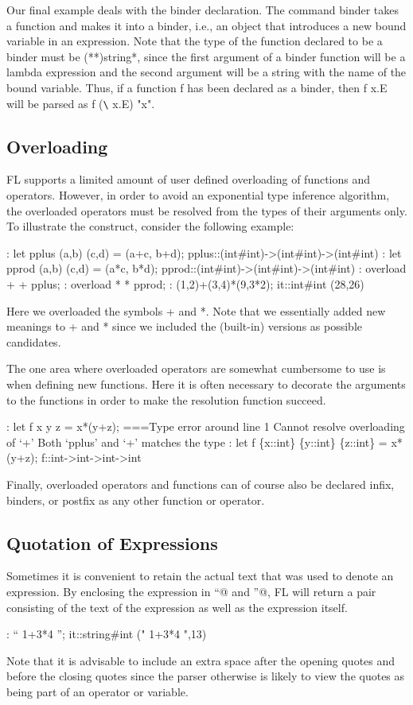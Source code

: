 Our final example deals with the binder declaration.
The command binder takes a function and makes it into a binder, i.e., an
object that introduces a new bound variable in an expression.
Note that the type of the function declared to be a binder must be
(*\funarrow **)\funarrow string\funarrow **, since the first argument of
a binder function will be a lambda expression and the second argument will
be a string with the name of the bound variable.
Thus, if a function f has been declared as a binder, then
f x.E will be parsed as f (\protect\verb!\! x.E) "x".

\subsection{Overloading}

FL supports a limited amount of user defined overloading%
%
{} of functions
and operators.
However, in order to avoid an exponential type inference algorithm, the
overloaded operators must be resolved from the types of their arguments only. 
To illustrate the construct, consider the following example:
\begin{hol}
: let pplus (a,b) (c,d) = (a+c, b+d);
pplus::(int#int)->(int#int)->(int#int)
: let pprod (a,b) (c,d) = (a*c, b*d);
pprod::(int#int)->(int#int)->(int#int)
: overload + + pplus;
: overload * * pprod;
: (1,2)+(3,4)*(9,3*2);
it::int#int
(28,26)
\end{hol}
Here we overloaded the symbols + and *.
Note that we essentially added new meanings to + and * since we included
the (built-in) versions as possible candidates.

The one area where overloaded operators are somewhat cumbersome to use is
when defining new functions.
Here it is often necessary to decorate the arguments to the functions
in order to make the resolution function succeed.
\begin{hol}
: let f x y z = x*(y+z);
===Type error around line 1
Cannot resolve overloading of `+'
Both `pplus' and `+' matches the type
: let f \{x::int\} \{y::int\} \{z::int\} = x*(y+z);
f::int->int->int->int
\end{hol}
Finally, overloaded operators and functions can of course also
be declared infix, binders, or postfix as any other function or operator.

\subsection{Quotation of Expressions}
Sometimes it is convenient to retain the actual text that was used
to denote an expression.
By enclosing the expression in \verb@``@ and \verb@''@, FL will return
a pair consisting of the text of the expression as well as the expression
itself.
\begin{hol}
: `` 1+3*4 '';
it::string#int
(" 1+3*4 ",13)
\end{hol}
Note that it is advisable to include an extra space after the opening quotes
and before the closing quotes since the parser otherwise is likely to
view the quotes as being part of an operator or variable.

